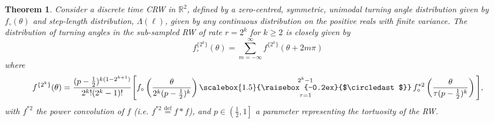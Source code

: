 \documentclass[english]{article}
\newtheorem{theorem}{Theorem}
\newcommand{\Conv}{%
  \mathop{\scalebox{1.5}{\raisebox{-0.2ex}{$\circledast$}}
  }
}
\begin{document}
\begin{theorem} Consider a discrete time CRW in $\mathbb{R}^2$, defined by a zero-centred, symmetric, unimodal turning angle distribution given by $f_\circ(\theta)$ and step-length distribution, $\Lambda(\ell)$, given by any continuous distribution on the positive reals with finite variance.  The distribution of turning angles in the sub-sampled RW of rate $r=2^k$ for $k\geq 2$ is closely given by
\begin{equation}\nonumber
    f^{\{2^k\}}_{\circ}(\theta)=\sum_{m=-\infty}^{\infty}f^{\{2^k\}}(\theta+2m\pi)
\end{equation} where 
    \begin{equation}\label{eq:theorem 2}
        f^{\{2^k\}}(\theta)=\frac{(p-\frac{1}{2})^{k(1-2^{k+1})}}{2^k!(2^k-1)!}\Bigg[f_\circ\left(\frac{\theta}{2^k(p-\frac{1}{2})^k}\right) \Conv_{\tau=1}^{2^k-1} f^{*2}_\circ\left(\frac{\theta}{\tau(p-\frac{1}{2})^k}\right)\Bigg],
    \end{equation}
with $f^{*2}$ the power convolution of $f$ (i.e. $f^{*2}\stackrel{\text{def}}{=}f\ast f$), and $p\in\left(\frac{1}{2},1\right]$ a parameter representing the tortuosity of the RW.
\end{theorem}
\end{document}
